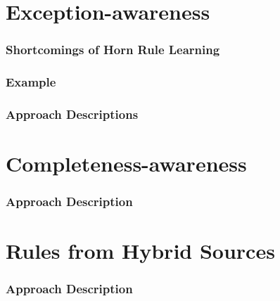 \documentclass{beamer}
\newcommand{\bl}[1]{\textcolor{blue}{#1}}
\begin{document}
\section{Exception-awareness}
\begin{frame}
\frametitle{Shortcomings of Horn Rule Learning}
\end{frame}
\begin{frame}
\frametitle{Example}
\end{frame}
\begin{frame}
\frametitle{Approach Descriptions}
\end{frame}
\section{Completeness-awareness}
\begin{frame}
\frametitle{Approach Description}
\end{frame}
\section{Rules from Hybrid Sources}
\begin{frame}
\frametitle{Approach Description}
\end{frame}


\end{document}
